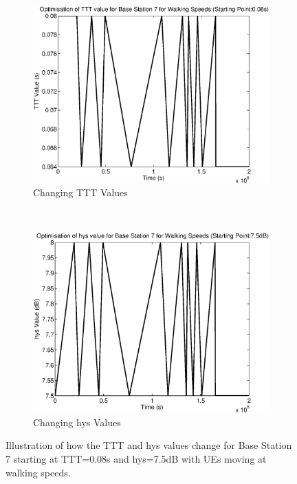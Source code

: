 \begin{figure}[H]
        \centering
        \begin{subfigure}[b]{0.49\textwidth}
                \includegraphics[width=\textwidth]{figures/graphs/walkhighhys/TTT7.eps}
                \caption{Changing TTT Values}
        \end{subfigure}%
        ~ %
        \begin{subfigure}[b]{0.49\textwidth}
                \includegraphics[width=\textwidth]{figures/graphs/walkhighhys/hys7.eps}
                \caption{Changing hys Values}
        \end{subfigure}
        \caption{Illustration of how the TTT and hys values change for Base Station 7 starting at TTT=0.08s and hys=7.5dB with UEs moving at walking speeds.}
\end{figure}
